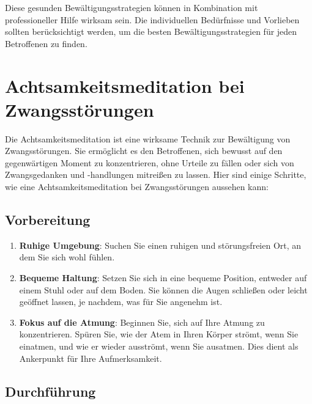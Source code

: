 Diese gesunden Bewältigungsstrategien können in Kombination mit professioneller Hilfe wirksam sein. Die individuellen Bedürfnisse und Vorlieben sollten berücksichtigt werden, um die besten Bewältigungsstrategien für jeden Betroffenen zu finden.


\section{Achtsamkeitsmeditation bei Zwangsstörungen}

Die Achtsamkeitsmeditation ist eine wirksame Technik zur Bewältigung von Zwangsstörungen. Sie ermöglicht es den Betroffenen, sich bewusst auf den gegenwärtigen Moment zu konzentrieren, ohne Urteile zu fällen oder sich von Zwangsgedanken und -handlungen mitreißen zu lassen. Hier sind einige Schritte, wie eine Achtsamkeitsmeditation bei Zwangsstörungen aussehen kann:

\subsection{Vorbereitung}

\begin{enumerate}
  \item \textbf{Ruhige Umgebung}: Suchen Sie einen ruhigen und störungsfreien Ort, an dem Sie sich wohl fühlen.
  
  \item \textbf{Bequeme Haltung}: Setzen Sie sich in eine bequeme Position, entweder auf einem Stuhl oder auf dem Boden. Sie können die Augen schließen oder leicht geöffnet lassen, je nachdem, was für Sie angenehm ist.
  
  \item \textbf{Fokus auf die Atmung}: Beginnen Sie, sich auf Ihre Atmung zu konzentrieren. Spüren Sie, wie der Atem in Ihren Körper strömt, wenn Sie einatmen, und wie er wieder ausströmt, wenn Sie ausatmen. Dies dient als Ankerpunkt für Ihre Aufmerksamkeit.
\end{enumerate}

\subsection{Durchführung}

